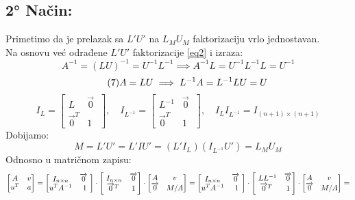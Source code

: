 \documentclass[11pt]{article}
\begin{document}
\subsection*{2° Način:}
Primetimo da je prelazak sa $L'U'$ na $L_MU_M$ faktorizaciju vrlo jednostavan.\\
Na osnovu već odrađene $L'U'$ faktorizacije \eqref{eq2} i izraza:
\begin{equation*}\tag{6}\label{eq6}
A^{-1}=(LU)^{-1}=U^{-1}L^{-1} \implies A^{-1}L=U^{-1}L^{-1}L=U^{-1}
\end{equation*}
\begin{equation*}\tag{7}\label{eq7}A=LU \implies L^{-1}A=L^{-1}LU=U\vspace{3mm}
\end{equation*}
\begin{equation*}\tag{8}\label{eq8}
I_L=
\begin{bmatrix}
L & \overrightarrow{0} \ \\ \overrightarrow{0}^T & 1
\end{bmatrix}, \quad
I_{L^{-1}}=
\begin{bmatrix}
L ^{-1}& \overrightarrow{0} \ \\ \overrightarrow{0}^T & 1
\end{bmatrix}, \quad I_LI_{L^{-1}}=I_{(n+1) \times (n+1)}
\end{equation*}
Dobijamo:
\begin{equation*}\tag{9}\label{eq9}
M=L'U'=L'IU'=(L'I_L)(I_{L^{-1}}U')=L_MU_M
\end{equation*}
Odnosno u matričnom zapisu:
\begin{equation*}
\begin{bmatrix}
A & v \\ u^T & a
\end{bmatrix}
=
\begin{bmatrix}
I_{n \times n} & \overrightarrow{0} \ \\ u^TA^{-1} & 1
\end{bmatrix}
\cdot
\begin{bmatrix}
\ I_{n \times n} & \overrightarrow{0}\\
\overrightarrow{0}^T & 1
\end{bmatrix}
\cdot
\begin{bmatrix}
A & v \\ \overrightarrow{0} & M/A
\end{bmatrix}
=
\begin{bmatrix}
I_{n \times n} & \overrightarrow{0} \ \\ u^TA^{-1} & 1
\end{bmatrix}
\cdot
\begin{bmatrix}
\ LL^{-1} & \overrightarrow{0}\\
\overrightarrow{0}^T & 1
\end{bmatrix}
\cdot
\begin{bmatrix}
A & v \\ \overrightarrow{0} & M/A
\end{bmatrix}
=\vspace{3mm}
\end{equation*}
\end{document}
